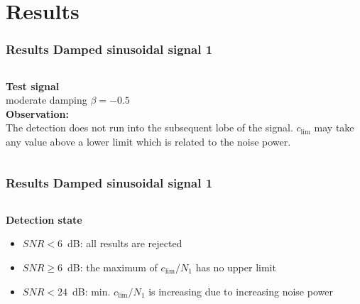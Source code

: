 \documentclass[11pt,aspectratio=169]{beamer}
\newcommand{\Ufigurefile}[1]{../octave/results/test_peakholdmax/png/#1}
\begin{document}
	\section{Results}
	\def\Utestsig{Test signal}
	\def\Udetstate{Detection state}
	\def\Uerrrelmean{Relative maximum point location error, mean}
	\def\Uerrrelstd{Relative maximum point location error, empirical standard deviation}
	\def\Uframetitle{Damped sinusoidal signal 1}
	\begin{frame}
		\frametitle{Results \textendash{} \Uframetitle}
		\begin{columns}[t]
			\begin{RIPcolleft}
				\begin{figure}
					\texttt{[image: \\Ufigurefile\{sig1]}}
				\end{figure}
			\end{RIPcolleft}
			\begin{RIPcolright}
				\textbf{\Utestsig}\\
				moderate damping $\beta = -0.5$\\
				\vspace*{.5em}
				\textbf{Observation:}\\
				The detection does not run into the subsequent lobe of the signal. $c_{\lim}$ may take any value above a lower limit which is related to the noise power.
			\end{RIPcolright}
		\end{columns}
	\end{frame}
	\begin{frame}
		\frametitle{Results \textendash{} \Uframetitle}
		\begin{columns}[t]
			\begin{RIPcolleft}
				\begin{figure}
					\texttt{[image: \\Ufigurefile\{snrvar1\_1]}}
				\end{figure}
			\end{RIPcolleft}
			\begin{RIPcolright}
				\textbf{\Udetstate}\\
				\begin{itemize}
					\item $SNR < 6$~dB: all results are rejected
					\item $SNR \geq 6$~dB: the maximum of $c_{\lim} / N_1$ has no upper limit
					\item $SNR < 24$~dB: min. $c_{\lim} / N_1$ is increasing due to increasing noise power
				\end{itemize}
			\end{RIPcolright}
		\end{columns}
	\end{frame}
\end{document}

